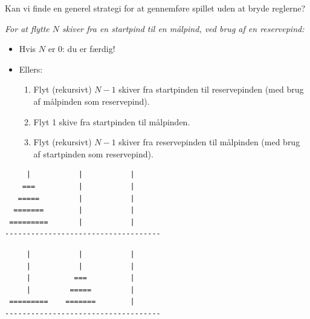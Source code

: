 \documentclass[rgb]{beamer}
\begin{document}
\begin{frame}[fragile]
\begin{footnotesize}

  \vspace{1ex}

  Kan vi finde en generel strategi for at gennemføre spillet uden at
  bryde reglerne?

    \vspace{1ex}


    \emph{For at flytte $N$ skiver fra en \emph{startpind} til en \emph{målpind}, ved brug af en \emph{reservepind}:}

    \vspace{1ex}

  \begin{minipage}[b]{0.55\textwidth}
  \begin{itemize}
  \item Hvis $N$ er $0$: du er færdig!
  \vspace{1ex}

\item Ellers:
  \begin{enumerate}
  \item Flyt (rekursivt) $N-1$ skiver fra startpinden til reservepinden (med brug af målpinden som reservepind).
  \item Flyt 1 skive fra startpinden til målpinden.
  \item Flyt (rekursivt) $N-1$ skiver fra reservepinden til målpinden (med brug af startpinden som reservepind).
    \end{enumerate}
  \end{itemize}
\end{minipage}\hfill\begin{minipage}[b]{0.4\textwidth}

\begin{tiny}
\begin{verbatim}
     |           |           |
    ===          |           |
   =====         |           |
  =======        |           |
 =========       |           |
------------------------------------
\end{verbatim}

\begin{verbatim}
     |           |           |
     |           |           |
     |          ===          |
     |         =====         |
 =========    =======        |
------------------------------------
\end{verbatim}
\end{tiny}
\end{minipage}

\end{footnotesize}
\end{frame}
\end{document}
